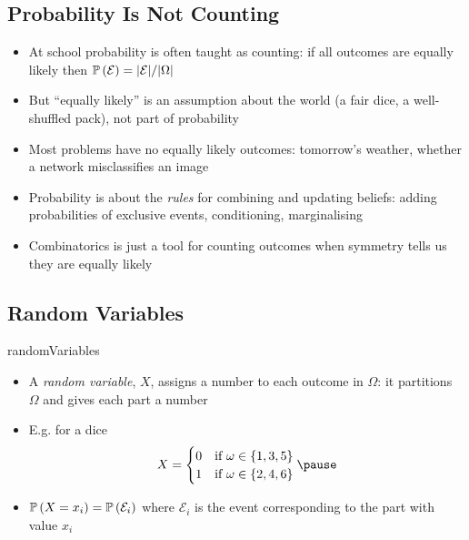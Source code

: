 \begin{slide}
\section[-1]{Probability Is Not Counting}

\begin{PauseHighLight}
  \begin{itemize}
  \item At school probability is often taught as counting: if all
    outcomes are equally likely then
    $\mathbb{P}\left( \mathcal{E} \right) = |\mathcal{E}|/|\Omega|$\pause
  \item But ``equally likely'' is an assumption about the world (a fair
    dice, a well-shuffled pack), not part of probability\pause
  \item Most problems have no equally likely outcomes: tomorrow's
    weather, whether a network misclassifies an image\pause
  \item Probability is about the \emph{rules} for combining and updating
    beliefs: adding probabilities of exclusive events, conditioning,
    marginalising\pause
  \item Combinatorics is just a tool for counting outcomes when symmetry
    tells us they are equally likely\pause
  \end{itemize}
\end{PauseHighLight}

\end{slide}


\begin{slide}
\section{Random Variables}

\begin{PauseHighLight}
  \begin{rightImage}{randomVariables}
    \begin{itemize}
    \item A \emph{random variable}, $X$, assigns a number to each outcome
      in $\Omega$: it partitions $\Omega$ and gives each part a
      number\pause
    \item E.g. for a dice
      \begin{align*}
        X =
        \begin{cases}
          0 & \text{if $\omega\in\{1,3,5\}$}\\
          1 & \text{if $\omega\in\{2,4,6\}$}
        \end{cases}\pause
      \end{align*}
    \item $\mathbb{P}\left( X=x_i \right) = \mathbb{P}\left( \mathcal{E}_i \right)$ where $\mathcal{E}_i$ is
      the event corresponding to the part with value
      $x_i$\pause
    \end{itemize}
  \end{rightImage}
\end{PauseHighLight}

\end{slide}

